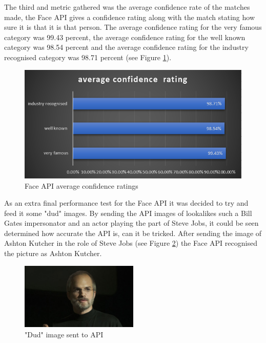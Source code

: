 \documentclass[12pt,a4paper]{article}
\begin{document}
The third and metric gathered was the average confidence rate of the matches made, the Face API gives a confidence rating along with the match stating how sure it is that it is that person. The average confidence rating for the very famous category was 99.43 percent, the average confidence rating for the well known category was 98.54 percent and the average confidence rating for the industry recognised category was 98.71 percent (see Figure \ref{fer3}).  


\begin{figure}[!ht]
    \centering
    \includegraphics[width=1.0\textwidth]{Figs/faceevalr3.PNG} 
    \caption{Face API average confidence ratings} 
    \label{fer3}
\end{figure}  

As an extra final performance test for the Face API it was decided to try  and feed it some "dud" images.  By sending the API images of lookalikes such a Bill Gates impersonator and an actor playing the part of Steve Jobs, it could be seen determined how accurate the API is, can it be tricked. After sending the image of Ashton Kutcher in the role of Steve Jobs (see Figure \ref{ash}) the Face API recognised the picture as Ashton Kutcher. 

\begin{figure}[!ht]
    \centering
    \includegraphics[width=0.5\textwidth]{Figs/ashton_kutcher_jobs_h_2013.jpg} 
    \caption{"Dud" image sent to API} 
    \label{ash}
\end{figure} 
\end{document}
